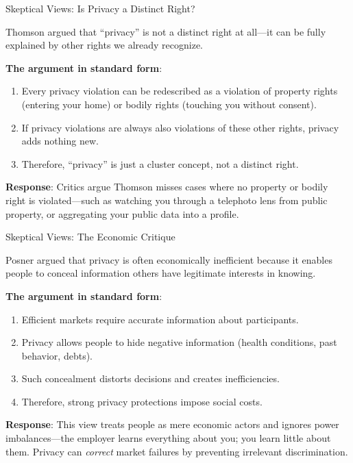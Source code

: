 ﻿\documentclass[aspectratio=169,11pt]{beamer}
\begin{document}
\begin{frame}{Skeptical Views: Is Privacy a Distinct Right?}
\begin{conceptbox}
\small
Thomson argued that ``privacy'' is not a distinct right at all---it can be fully explained by other rights we already recognize.
\end{conceptbox}

\vspace{0.1em}
\textbf{The argument in standard form}:
\begin{enumerate}
    \item Every privacy violation can be redescribed as a violation of property rights (entering your home) or bodily rights (touching you without consent).
    \item If privacy violations are always also violations of these other rights, privacy adds nothing new.
    \item Therefore, ``privacy'' is just a cluster concept, not a distinct right.
\end{enumerate}

\vspace{0.1em}
{\small \textbf{Response}: Critics argue Thomson misses cases where no property or bodily right is violated---such as watching you through a telephoto lens from public property, or aggregating your public data into a profile.}
\end{frame}

\begin{frame}{Skeptical Views: The Economic Critique}
\begin{objectionbox}
\small
Posner argued that privacy is often economically inefficient because it enables people to conceal information others have legitimate interests in knowing.
\end{objectionbox}

\vspace{0.1em}
\textbf{The argument in standard form}:
\begin{enumerate}
    \item Efficient markets require accurate information about participants.
    \item Privacy allows people to hide negative information (health conditions, past behavior, debts).
    \item Such concealment distorts decisions and creates inefficiencies.
    \item Therefore, strong privacy protections impose social costs.
\end{enumerate}

\vspace{0.1em}
{\small \textbf{Response}: This view treats people as mere economic actors and ignores power imbalances---the employer learns everything about you; you learn little about them. Privacy can \emph{correct} market failures by preventing irrelevant discrimination.}
\end{frame}
\end{document}
